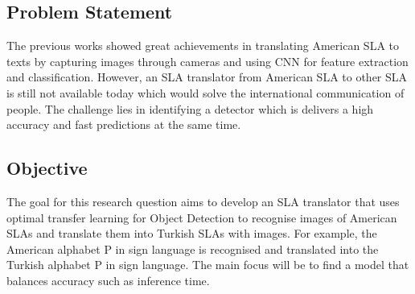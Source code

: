 \subsection{Problem Statement}
The previous works showed great achievements in translating American SLA to texts by capturing images through cameras and using CNN for feature extraction and classification. However, an SLA translator from American SLA to other SLA is still not available today which would solve the international communication of people. The challenge lies in identifying a detector which is delivers a high accuracy and fast predictions at the same time.

\subsection{Objective}
The goal for this research question aims to develop an SLA translator that uses optimal transfer learning for Object Detection to recognise images of American SLAs and translate them into Turkish SLAs with images. For example, the American alphabet P in sign language is recognised and translated into the Turkish alphabet P in sign language. The main focus will be to find a model that balances accuracy such as inference time.